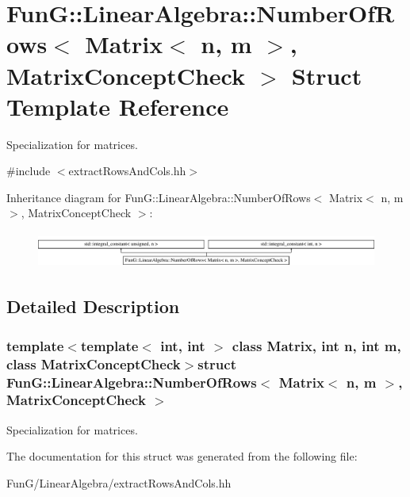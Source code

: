 \hypertarget{structFunG_1_1LinearAlgebra_1_1NumberOfRows_3_01Matrix_3_01n_00_01m_01_4_00_01MatrixConceptCheck_01_4}{\section{Fun\-G\-:\-:Linear\-Algebra\-:\-:Number\-Of\-Rows$<$ Matrix$<$ n, m $>$, Matrix\-Concept\-Check $>$ Struct Template Reference}
\label{structFunG_1_1LinearAlgebra_1_1NumberOfRows_3_01Matrix_3_01n_00_01m_01_4_00_01MatrixConceptCheck_01_4}
}


Specialization for matrices.  




{\ttfamily \#include $<$extract\-Rows\-And\-Cols.\-hh$>$}

Inheritance diagram for Fun\-G\-:\-:Linear\-Algebra\-:\-:Number\-Of\-Rows$<$ Matrix$<$ n, m $>$, Matrix\-Concept\-Check $>$\-:\begin{figure}[H]
\begin{center}
\leavevmode
\includegraphics[height=1.199143cm]{structFunG_1_1LinearAlgebra_1_1NumberOfRows_3_01Matrix_3_01n_00_01m_01_4_00_01MatrixConceptCheck_01_4}
\end{center}
\end{figure}


\subsection{Detailed Description}
\subsubsection*{template$<$template$<$ int, int $>$ class Matrix, int n, int m, class Matrix\-Concept\-Check$>$struct Fun\-G\-::\-Linear\-Algebra\-::\-Number\-Of\-Rows$<$ Matrix$<$ n, m $>$, Matrix\-Concept\-Check $>$}

Specialization for matrices. 

The documentation for this struct was generated from the following file\-:\begin{DoxyCompactItemize}
\item 
Fun\-G/\-Linear\-Algebra/extract\-Rows\-And\-Cols.\-hh\end{DoxyCompactItemize}
